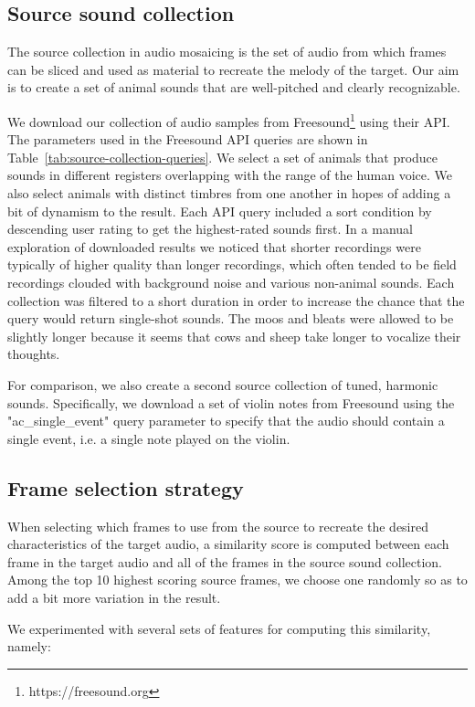 \documentclass{article}
\begin{document}
\subsection{Source sound collection}

The source collection in audio mosaicing is the set of audio from which frames can be sliced and used as material to recreate the melody of the target.
Our aim is to create a set of animal sounds that are well-pitched and clearly recognizable.

We download our collection of audio samples from Freesound\footnote{https://freesound.org} using their API.
The parameters used in the Freesound API queries are shown in Table~\ref{tab:source-collection-queries}.
We select a set of animals that produce sounds in different registers overlapping with the range of the human voice.
We also select animals with distinct timbres from one another in hopes of adding a bit of dynamism to the result.
Each API query included a sort condition by descending user rating to get the highest-rated sounds first.
In a manual exploration of downloaded results we noticed that shorter recordings were typically of higher quality than longer recordings, which often tended to be field recordings clouded with background noise and various non-animal sounds.
Each collection was filtered to a short duration in order to increase the chance that the query would return single-shot sounds.
The moos and bleats were allowed to be slightly longer because it seems that cows and sheep take longer to vocalize their thoughts.

For comparison, we also create a second source collection of tuned, harmonic sounds.
Specifically, we download a set of violin notes from Freesound using the "ac\_single\_event" query parameter to specify that the audio should contain a single event, i.e. a single note played on the violin.


\subsection{Frame selection strategy}

When selecting which frames to use from the source to recreate the desired characteristics of the target audio, a similarity score is computed between each frame in the target audio and all of the frames in the source sound collection.
Among the top 10 highest scoring source frames, we choose one randomly so as to add a bit more variation in the result.

We experimented with several sets of features for computing this similarity, namely:
\end{document}
